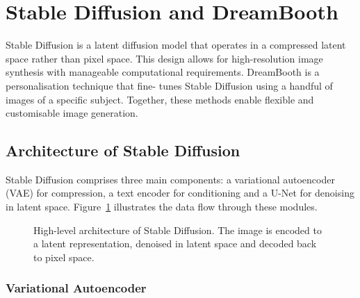 

\section{Stable Diffusion and DreamBooth}

Stable Diffusion is a latent diffusion model that operates in a
compressed latent space rather than pixel space.  This design allows
for high-resolution image synthesis with manageable computational
requirements.  DreamBooth is a personalisation technique that fine-
tunes Stable Diffusion using a handful of images of a specific
subject.  Together, these methods enable flexible and customisable
image generation.

\subsection{Architecture of Stable Diffusion}

Stable Diffusion comprises three main components: a variational
autoencoder (VAE) for compression, a text encoder for conditioning
and a U-Net for denoising in latent space.  Figure~\ref{fig:stablearch}
illustrates the data flow through these modules.

\begin{figure}[H]
  \centering
  \caption{High-level architecture of Stable Diffusion.  The image is
    encoded to a latent representation, denoised in latent space and
    decoded back to pixel space.}
  \label{fig:stablearch}
\end{figure}

\subsubsection{Variational Autoencoder}

